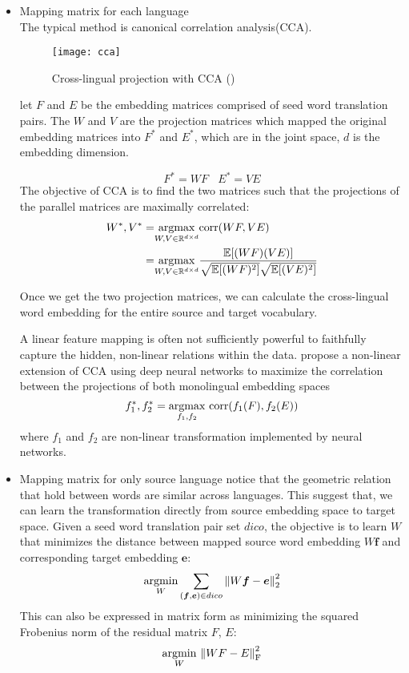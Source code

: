 \begin{itemize}
	\item Mapping matrix for each language\\
	The typical method is  canonical correlation analysis(CCA).
	\begin{figure}[t]
		\texttt{[image: cca]}
		\centering
		\caption{Cross-lingual projection with CCA (\cite{faruqui2014improving})}
	\end{figure}
	let $F $ and $E$ be the embedding matrices comprised of seed word translation pairs. The  $W$ and $V$ are the projection matrices which mapped the original embedding matrices into $F^{*}$ and $E^{*}$, which are in the joint space, $d$ is the embedding dimension.
	
	\[ {F}^{*} = W{F} \ \ \ \  {E}^{*} = V{E} \] 
	The objective of CCA is to find the two matrices such that the projections of the parallel matrices are maximally correlated:
	\begin{align}
		W^*, V^* =& \underset{W, V \in \mathbb{R}^{d \times d}}{\operatorname{argmax}} \text{corr}(WF, VE)\\
		= &\underset{W, V \in \mathbb{R}^{d \times d}}{\operatorname{argmax}} \frac{\mathbb{E}[(W{F})(V{E})]}{\sqrt{\mathbb{E}[(W{F})^2]} \sqrt{\mathbb{E}[( V{E})^2]}}
	\end{align}

	Once we get the two projection matrices, we can calculate the cross-lingual word embedding for the entire source and target vocabulary.
	
	A linear feature mapping is often not sufficiently powerful to faithfully capture the hidden, non-linear relations within the data. \cite{lu2015deep} propose a non-linear extension of CCA using deep neural networks to maximize the
	correlation between the projections of both monolingual embedding spaces
	\[ f_1^*, f_2^* = \argmax{f_1, f_2} \ \text{corr}(f_1(F), f_2(E)) \]
	where $f_1$ and $f_2$ are non-linear transformation implemented by neural networks.
	
	\item Mapping matrix for only source language
	\cite{mikolov2013exploiting} notice that the geometric relation that hold between words are similar across languages. This suggest that, we can learn the transformation directly from source embedding space to target space.
	Given a seed word translation pair set $dico$, the objective is to learn $W$ that minimizes the distance between mapped source word embedding $W\bm{f}$ and corresponding target embedding $\bm{e}$:
	\[ \underset{W}{\operatorname{argmin}} \sum_{(\bm{f}, \bm{e}) \in dico}  {\lVert W\bm{f} - \bm{e} \rVert}_2^2 \]
	This can also be expressed in matrix form as minimizing the squared Frobenius norm of the residual matrix $F$, $E$:
	\[ \underset{W}{\operatorname{argmin}} {\ \lVert WF - E \rVert}_{\text{F}}^2 \]
	

\end{itemize}
